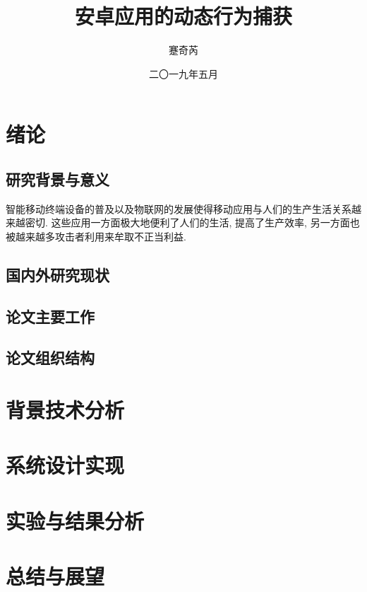 \documentclass[forprint]{WHUBachelor}
\begin{document}

\miji{ }                                      %

\title{安卓应用的动态行为捕获}
\author{蹇奇芮}                            %
\date{二〇一九年五月}                    %

\maketitle
\frontmatter
{}              %
\tableofcontents
\mainmatter %
\chapter{绪论}
\section{研究背景与意义}
智能移动终端设备的普及以及物联网的发展使得移动应用与人们的生产生活关系越来越密切. 这些应用一方面极大地便利了人们的生活, 提高了生产效率, 另一方面也被越来越多攻击者利用来牟取不正当利益. 
\section{国内外研究现状}
\section{论文主要工作}
\section{论文组织结构}
 

\chapter{背景技术分析}

\chapter{系统设计实现}
\chapter{实验与结果分析}
\chapter{总结与展望}

\cleardoublepage
\end{document}
